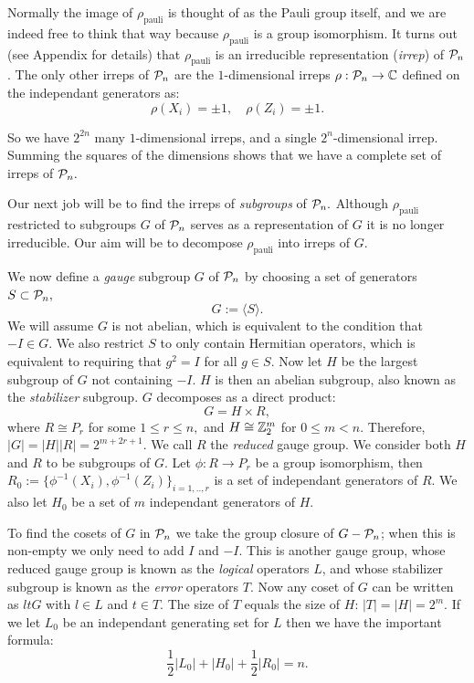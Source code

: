 \documentclass[12pt,notitlepage,longbibliography,nofootinbib,tightenlines]{revtex4}
\begin{document}
Normally the image of 
$\rho_{\mathrm{pauli}}$ is thought of as the
Pauli group itself, and we are indeed free to think
that way because $\rho_{\mathrm{pauli}}$ is a group
isomorphism.
It turns out (see Appendix for details)
that $\rho_{\mathrm{pauli}}$ is an
irreducible representation ({\it irrep}) of $\mathcal{P}_n$. 
The only other irreps of $\mathcal{P}_n$ are 
the $1$-dimensional irreps $\rho:\mathcal{P}_n\to\mathbb{C}$
defined on the independant generators as:
    $$ \rho(X_i) = \pm 1,\quad \rho(Z_i) = \pm 1.$$

So we have $2^{2n}$ many $1$-dimensional irreps,
and a single $2^n$-dimensional irrep.
Summing the squares of the dimensions
shows that we have a complete set of irreps of $\mathcal{P}_n.$

Our next job will be to find the irreps of {\it subgroups} of $\mathcal{P}_n.$
Although $\rho_{\mathrm{pauli}}$
restricted to subgroups $G$ of $\mathcal{P}_n$ serves as a representation
of $G$ it is no longer irreducible.
Our aim will be to decompose $\rho_{\mathrm{pauli}}$ into irreps
of $G.$

We now define a {\it gauge} subgroup $G$ of $\mathcal{P}_n$
by choosing a set of generators $S\subset \mathcal{P}_n,$
$$ G := \langle S\rangle.$$
We will assume $G$ is not abelian, which is
equivalent to the condition that $-I\in G.$
We also restrict $S$ to only contain Hermitian operators,
which is equivalent to requiring that $g^2=I$ for all $g\in S.$
Now let $H$ be the largest subgroup of $G$ not containing
$-I.$
$H$ is then an abelian subgroup,
also known as the {\it stabilizer} subgroup.
$G$ decomposes as a direct product:
$$G = H\times R,$$
where $R\cong P_r$ for some $1\le r\le n,$
and $H\cong \mathbb{Z}_2^{m}$ for $0\le m<n.$
Therefore, $|G| = |H| |R| = 2^{m+2r+1}.$
We call $R$ the {\it reduced} gauge group.
We consider both $H$ and $R$ to be subgroups of $G.$
Let $\phi:R\to P_r$ be a group isomorphism,
then $R_0 := \{\phi^{-1}(X_i), \phi^{-1}(Z_i)\}_{i=1,..,r}$
is a set of independant generators of $R.$
We also let $H_0$ be a set of $m$ independant generators of $H.$

To find the cosets of $G$ in $\mathcal{P}_n$ we take
the group closure of $G-\mathcal{P}_n$; when this is non-empty
we only need to add $I$ and $-I.$
This is another
gauge group, whose reduced gauge group is known as
the {\it logical} operators $L$, and whose 
stabilizer subgroup is known as the {\it error} operators $T.$
Now any coset of $G$ can be written as $ltG$ with
$l\in L$ and $t\in T.$
The size of $T$ equals the size of $H$: $|T|=|H|=2^m.$
If we let $L_0$ be an independant generating set for $L$
then we have the important formula:
\begin{equation}\label{formula}
\frac{1}{2}|L_0| + |H_0| + \frac{1}{2}|R_0| = n.
\end{equation}
\end{document}
